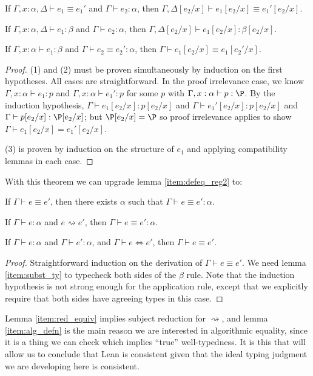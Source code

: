 \begin{lemma}\label{thm:subst}
\begin{thmlist}
\item If $\Gamma,x:\alpha,\Delta\vdash e_1\equiv e_1'$ and $\Gamma\vdash e_2:\alpha$, then $\Gamma,\Delta[e_2/x]\vdash e_1[e_2/x]\equiv e_1'[e_2/x]$.
\item\label{item:subst_ty} If $\Gamma,x:\alpha,\Delta\vdash e_1:\beta$ and $\Gamma\vdash e_2:\alpha$, then $\Gamma,\Delta[e_2/x]\vdash e_1[e_2/x]:\beta[e_2/x]$.
\item If $\Gamma,x:\alpha\vdash e_1:\beta$ and $\Gamma\vdash e_2\equiv e_2':\alpha$, then $\Gamma\vdash e_1[e_2/x]\equiv e_1[e_2'/x]$.
\end{thmlist}
\end{lemma}
\begin{proof} (1) and (2) must be proven simultaneously by induction on the first hypotheses. All cases are straightforward. In the proof irrelevance case, we know $\Gamma,x:\alpha\vdash e_1:p$ and $\Gamma,x:\alpha\vdash e_1':p$ for some $p$ with $\Gamma,x:\alpha\vdash p:\P$. By the induction hypothesis, $\Gamma\vdash e_1[e_2/x]:p[e_2/x]$ and $\Gamma\vdash e_1'[e_2/x]:p[e_2/x]$ and $\Gamma\vdash p[e_2/x]:\P[e_2/x]$; but $\P[e_2/x]=\P$ so proof irrelevance applies to show $\Gamma\vdash e_1[e_2/x]=e_1'[e_2/x]$.

(3) is proven by induction on the structure of $e_1$ and applying compatibility lemmas in each case.
\end{proof}

With this theorem we can upgrade lemma \ref{item:defeq_reg2} to:
\begin{lemma}
\begin{thmlist}
\item If $\Gamma\vdash e\equiv e'$, then there exists $\alpha$ such that $\Gamma\vdash e\equiv e':\alpha$.
\item\label{item:red_equiv} If $\Gamma\vdash e:\alpha$ and $e\rightsquigarrow e'$, then $\Gamma\vdash e\equiv e':\alpha$.
\item\label{item:alg_defn} If $\Gamma\vdash e:\alpha$ and $\Gamma\vdash e':\alpha$, and $\Gamma\vdash e\Leftrightarrow e'$, then $\Gamma\vdash e\equiv e'$.
\end{thmlist}
\end{lemma}
\begin{proof}
Straightforward induction on the derivation of $\Gamma\vdash e\equiv e'$. We need lemma \ref{item:subst_ty} to typecheck both sides of the $\beta$ rule. Note that the induction hypothesis is not strong enough for the application rule, except that we explicitly require that both sides have agreeing types in this case.
\end{proof}

Lemma \ref{item:red_equiv} implies subject reduction for $\rightsquigarrow$, and lemma \ref{item:alg_defn} is the main reason we are interested in algorithmic equality, since it is a thing we can check which implies ``true'' well-typedness. It is this that will allow us to conclude that Lean is consistent given that the ideal typing judgment we are developing here is consistent.
